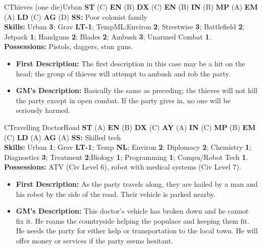 \hrulefill

\begin{npc}{C}{Thieves (one die)}{Urban}
\textbf{ST} (C) \textbf{EN} (B) \textbf{DX} (C) \textbf{EN} (B) \textbf{IN} (B) \textbf{MP} (A) \textbf{EM} (A) \textbf{LD} (C) \textbf{AG} (D) \textbf{SS:} Poor colonist family \\
\textbf{Skills:} Urban \textbf{3}; Grav \textbf{LT-1}; TempML;Environ \textbf{2}; Streetwise \textbf{3}; Battlefield \textbf{2}; Jetpack \textbf{1}; 
Handguns \textbf{2}; Blades \textbf{2}; Ambush \textbf{3}; Unarmed Combat \textbf{1}. \\
\textbf{Possessions:} Pistols, daggers, stun guns. 
\begin{itemize}
\item \textbf{First Description:} The first description in this case may be a hit on the head; the group of thieves will attempt to ambush and rob the 
party. 
\item \textbf{GM's Description:} Basically the same as preceding; the thieves will not kill the party except in open combat. If the party gives in, no 
one will be seriously harmed. 
\end{itemize}
\end{npc}

\hrulefill

\begin{npc}{C}{Travelling Doctor}{Road}
\textbf{ST} (A) \textbf{EN} (B) \textbf{DX} (C) \textbf{AY} (A) \textbf{IN} (C) \textbf{MP} (B) \textbf{EM} (C) \textbf{LD} (A) \textbf{AG} (A) \textbf{SS:} Skilled tech \\
\textbf{Skills:} Urban \textbf{1}; Grav \textbf{LT-1}; Temp  \textbf{NL}; Environ \textbf{2}; Diplomacy \textbf{2}; Chemistry \textbf{1}; Diagnostics \textbf{3}; Treatment \textbf{2};Biology \textbf{1}; Programming \textbf{1}; 
Compu/Robot Tech \textbf{1}. \\
\textbf{Possessions:} ATV (Civ Level 6), robot with medical systems (Civ Level 7). 
\begin{itemize}
\item \textbf{First Description:} As the party travels along, they are hailed by a man and his robot by the side of the road. Their vehicle is parked 
nearby. 
\item \textbf{GM's Description:} This doctor's vehicle has broken down and he cannot fix it. He roams the countryside helping the populace and 
keeping them fit. He needs the party for either help or transportation to the local town. He will offer money or services if the party 
seems hesitant. 
\end{itemize}
\end{npc}

